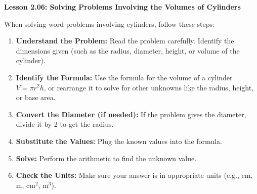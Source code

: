 \begin{center}
\textbf{Lesson 2.06: Solving Problems Involving the Volumes of Cylinders}
\end{center}

\vspace*{-1.5ex}

When solving word problems involving cylinders, follow these steps:

\begin{enumerate}[noitemsep, label = \color{blue}\arabic*. ]
    \item \textbf{Understand the Problem:} Read the problem carefully. Identify the dimensions given (such as the radius, diameter, height, or volume of the cylinder).
    \item \textbf{Identify the Formula:} Use the formula for the volume of a cylinder \(V = \pi r^{2}h\), or rearrange it to solve for other unknowns like the radius, height, or base area.
    \item \textbf{Convert the Diameter (if needed):} If the problem gives the diameter, divide it by 2 to get the radius.
    \item \textbf{Substitute the Values:} Plug the known values into the formula.
    \item \textbf{Solve:} Perform the arithmetic to find the unknown value.
    \item \textbf{Check the Units:} Make sure your answer is in appropriate units (e.g., cm, m, cm\(^2\), m\(^3\)).
\end{enumerate}



